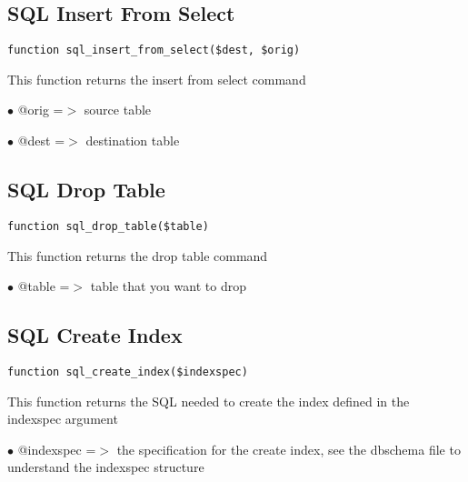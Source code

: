 \documentclass[a4paper]{book}
\begin{document}
\hypertarget{toc239}{}
\subsection{SQL Insert From Select}

\begin{lstlisting}
function sql_insert_from_select($dest, $orig)
\end{lstlisting}

This function returns the insert from select command

\begin{compactitem}
\item[\color{myblue}$\bullet$] @orig =$>$ source table
\item[\color{myblue}$\bullet$] @dest =$>$ destination table
\end{compactitem}

\hypertarget{toc240}{}
\subsection{SQL Drop Table}

\begin{lstlisting}
function sql_drop_table($table)
\end{lstlisting}

This function returns the drop table command

\begin{compactitem}
\item[\color{myblue}$\bullet$] @table =$>$ table that you want to drop
\end{compactitem}

\hypertarget{toc241}{}
\subsection{SQL Create Index}

\begin{lstlisting}
function sql_create_index($indexspec)
\end{lstlisting}

This function returns the SQL needed to create the index defined in the
indexspec argument

\begin{compactitem}
\item[\color{myblue}$\bullet$] @indexspec =$>$ the specification for the create index, see the dbschema
              file to understand the indexspec structure
\end{compactitem}
\end{document}
